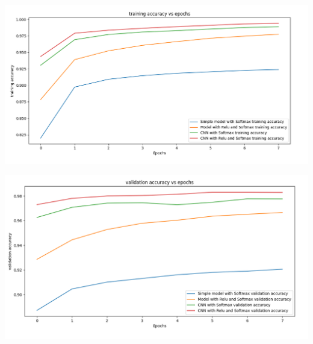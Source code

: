 \documentclass[11pt]{amsart}
\begin{document}
\hspace{-0.3in}
\begin{minipage}{0.52\linewidth}
\includegraphics[width = \linewidth]{Training_accuracy.png}
\end{minipage}
\begin{minipage}{0.52\linewidth}
\includegraphics[width = \linewidth]{Validation_accuracy.png}
\end{minipage}
\end{document}
